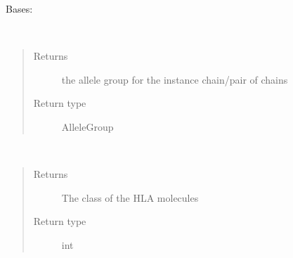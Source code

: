 \documentclass[letterpaper,10pt,english]{sphinxmanual}
\begin{document}
\begin{fulllineitems}
\label{\detokenize{IPTK.Classes:IPTK.Classes.HLAMolecules.HLAMolecule}}
Bases: 

\begin{fulllineitems}
\label{\detokenize{IPTK.Classes:IPTK.Classes.HLAMolecules.HLAMolecule.get_allele_group}}~\begin{quote}\begin{description}
\item[{Returns}] \leavevmode
the allele group for the instance chain/pair of chains

\item[{Return type}] \leavevmode
AlleleGroup

\end{description}\end{quote}

\end{fulllineitems}


\begin{fulllineitems}
\label{\detokenize{IPTK.Classes:IPTK.Classes.HLAMolecules.HLAMolecule.get_class}}~\begin{quote}\begin{description}
\item[{Returns}] \leavevmode
The class of the HLA molecules

\item[{Return type}] \leavevmode
int

\end{description}\end{quote}

\end{fulllineitems}


\end{fulllineitems}
\end{document}
